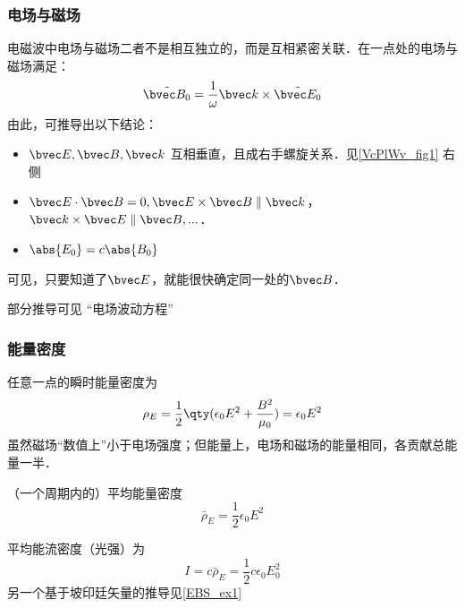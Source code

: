 \subsubsection{电场与磁场}
电磁波中电场与磁场二者不是相互独立的，而是互相紧密关联．在一点处的电场与磁场满足：
\begin{equation}
\tilde {\bvec B_0} = \frac{1}{\omega} \bvec k \times \tilde {\bvec E_0} 
\end{equation}
由此，可推导出以下结论：
\begin{itemize}
\item $\bvec E, \bvec B, \bvec k$ 互相垂直，且成右手螺旋关系．见\autoref{VcPlWv_fig1} 右侧
\item $\bvec E \cdot \bvec B = 0,\bvec E \times \bvec B \parallel \bvec k$，$\bvec k \times \bvec E \parallel \bvec B, ...$．
\item $\abs{E_0}=c\abs{B_0}$
\end{itemize}
可见，只要知道了$\bvec E$，就能很快确定同一处的$\bvec B$．

部分推导可见 “电场波动方程”

\subsubsection{能量密度}
任意一点的瞬时能量密度为
\begin{equation}\label{VcPlWv_eq2}
\rho_E = \frac{1}{2}\qty(\epsilon_0 E^2 + \frac{B^2}{\mu_0}) = \epsilon_0 E^2
\end{equation}
虽然磁场“数值上”小于电场强度；但能量上，电场和磁场的能量相同，各贡献总能量一半． 

（一个周期内的）平均能量密度
\begin{equation}
\bar \rho_E = \frac{1}{2} \epsilon_0 E^2
\end{equation}

平均能流密度（光强）为
\begin{equation}
I = c \bar \rho_E = \frac12 c\epsilon_0 E_0^2
\end{equation}
另一个基于坡印廷矢量的推导见\autoref{EBS_ex1}~%


